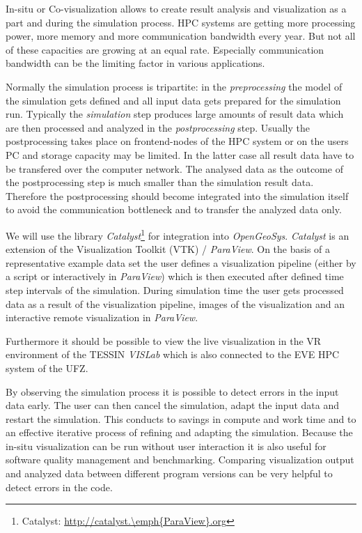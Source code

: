In-situ or Co-visualization allows to create result analysis and visualization as a part and during the simulation process. HPC systems are getting more processing power, more memory and more communication bandwidth every year. But not all of these capacities are growing at an equal rate. Especially communication bandwidth can be the limiting factor in various applications.

Normally the simulation process is tripartite: in the \emph{preprocessing} the model of the simulation gets defined and all input data gets prepared for the simulation run. Typically the \emph{simulation} step produces large amounts of result data which are then processed and analyzed in the \emph{postprocessing} step. Usually the postprocessing takes place on frontend-nodes of the HPC system or on the users PC and storage capacity may be limited. In the latter case all result data have to be transfered over the computer network. The analysed data as the outcome of the postprocessing step is much smaller than the simulation result data. Therefore the postprocessing should become integrated into the simulation itself to avoid the communication bottleneck and to transfer the analyzed data only.

We will use the library \emph{Catalyst}\footnote{Catalyst: \url{http://catalyst.\emph{ParaView}.org}} for integration into \emph{OpenGeoSys}. \emph{Catalyst} is an extension of the Visualization Toolkit (VTK) / \emph{ParaView}. On the basis of a representative example data set the user defines a visualization pipeline (either by a script or interactively in \emph{ParaView}) which is then executed after defined time step intervals of the simulation. During simulation time the user gets processed data as a result of the visualization pipeline, images of the visualization and an interactive remote visualization in \emph{ParaView}.

Furthermore it should be possible to view the live visualization in the VR environment of the TESSIN \emph{VISLab} which is also connected to the EVE HPC system of the UFZ.

By observing the simulation process it is possible to detect errors in the input data early. The user can then cancel the simulation, adapt the input data and restart the simulation. This conducts to savings in compute and work time and to an effective iterative process of refining and adapting the simulation. Because the in-situ visualization can be run without user interaction it is also useful for software quality management and benchmarking. Comparing visualization output and analyzed data between different program versions can be very helpful to detect errors in the code.

